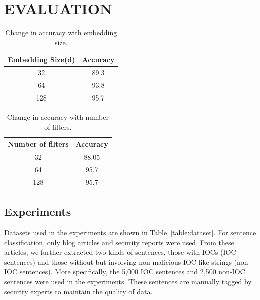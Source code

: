 \chapter{EVALUATION} \label{evaluation}
\begin{table}[tb]
\caption{Change in accuracy with embedding size.} %
\centering %
\begin{tabular}{c c} %
\hline\hline %
Embedding Size(d) & Accuracy \\ [0.5ex] %
\hline %
32 & 89.3 \\
64 & 93.8\\ %
128 &  95.7\\[1ex] %
\hline %
\end{tabular}
\label{table:accuracyembedding} %
\end{table}

\begin{table}[tb]
\caption{Change in accuracy with number of filters.} %
\centering %
\begin{tabular}{c c} %
\hline\hline %
Number of filters & Accuracy \\ [0.5ex] %
\hline %
32 & 88.05 \\
64 & 95.7\\ %
128 &  95.7\\[1ex] %
\hline %
\end{tabular}
\label{table:accuracyfilters} %
\end{table}



\section{Experiments}
Datasets used in the experiments are shown in Table~\ref{table:dataset}. For sentence classification, only blog articles and security reports were used.
From these articles, we further extracted two kinds of sentences, those with IOCs (IOC sentences) and those without but involving non-malicious IOC-like strings (non-IOC sentences). More specifically, the 5,000 IOC sentences and 2,500 non-IOC sentences were used in the experiments. These sentences are manually tagged by security experts to maintain the quality of data.

